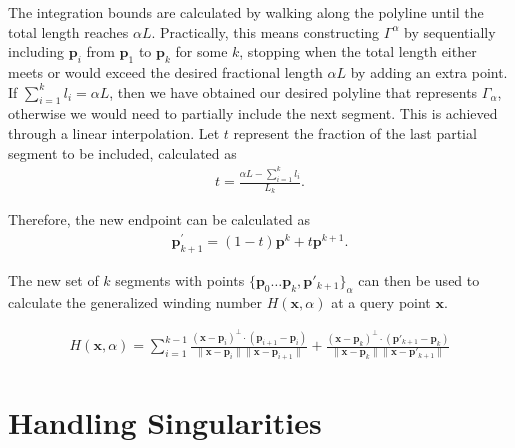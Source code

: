 \documentclass[acmtog, nonacm]{acmart}
\begin{document}
The integration bounds are calculated by walking along the polyline until the total length reaches $\alpha L$. Practically, this means constructing $\Gamma^\alpha$ by sequentially including $\mathbf{p}_i$ from $\mathbf{p}_1$ to $\mathbf{p}_k$ for some $k$, stopping when the total length either meets or would exceed the desired fractional length $\alpha L$  by adding an extra point. If $\sum_{i=1}^k l_i = \alpha L$, then we have obtained our desired polyline that represents $\Gamma_\alpha$, otherwise we would need to partially include the next segment. This is achieved through a linear interpolation. Let $t$ represent the fraction of the last partial segment to be included, calculated as
\begin{align}
    t = \frac{\alpha L - \sum_{i=1}^k l_i}{L_k}.
\end{align}

Therefore, the new endpoint can be calculated as 
\begin{align}
\mathbf{p}^{'}_{k+1}=(1 - t)\mathbf{p}^{k} + t\mathbf{p}^{k+1}.
\end{align}

The new set of $k$ segments with points $ \{\mathbf{p}_{0} \dots \mathbf{p}_{k}, \mathbf{p}'_{k+1}\}_{\alpha} $ can then be used to calculate the generalized winding number $H(\mathbf{x}, \alpha)$ at a query point $\mathbf{x}$.

\begin{align}
\label{eq:discrete_gwn}
    H(\mathbf{x}, \alpha) =  \sum_{i=1}^{k-1} \frac{(\mathbf{x} - \mathbf{p}_{i})^\perp \cdot (\mathbf{p}_{i+1} - \mathbf{p}_{i})}{\|\mathbf{x} - \mathbf{p}_{i}\| \|\mathbf{x} - \mathbf{p}_{i+1}\|} +  \frac{(\mathbf{x} - \mathbf{p}_{k})^\perp \cdot (\mathbf{p}'_{k+1} - \mathbf{p}_{k})}{\|\mathbf{x} - \mathbf{p}_{k}\| \|\mathbf{x} - \mathbf{p}'_{k+1}\|}
\end{align}



\section{Handling Singularities}
\end{document}
